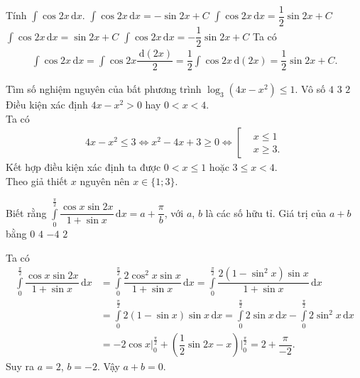\begin{ex}%
 Tính $\displaystyle\int \cos2x\mathrm{\,d}x$.
 \choice
  {$\displaystyle\int \cos2x\mathrm{\,d}x = -\sin2x+C$}
  {\True $\displaystyle\int \cos2x\mathrm{\,d}x = \dfrac{1}{2}\sin2x+C$}
  {$\displaystyle\int \cos2x\mathrm{\,d}x = \sin2x+C$}
  {$\displaystyle\int \cos2x\mathrm{\,d}x = -\dfrac{1}{2}\sin2x+C$}
 \loigiai
  {
  Ta có
  \begin{eqnarray*}
   \displaystyle\int \cos2x\mathrm{\,d}x = \displaystyle\int \cos2x\dfrac{\mathrm{\,d}(2x)}{2}=\dfrac{1}{2}\displaystyle\int \cos2x\mathrm{\,d}(2x) = \dfrac{1}{2}\sin 2x + C.
  \end{eqnarray*}
  }
\end{ex}

\begin{ex}%
 Tìm số nghiệm nguyên của bất phương trình $\log_3\left(4x-x^2\right)\leq 1$.
 \choice
  {Vô số}
  {$4$}
  {$3$}
  {\True $2$}
 \loigiai
  {
  Điều kiện xác định $4x-x^2>0$ hay $0<x<4$.\\
  Ta có
  \begin{eqnarray*}
   4x-x^2 \leq 3 \Leftrightarrow x^2-4x+3 \geq 0 \Leftrightarrow \left[\begin{aligned}&x\leq 1 \\& x\geq 3.\end{aligned}\right.
  \end{eqnarray*}
  Kết hợp điều kiện xác định ta được $0<x \leq 1$ hoặc $3\leq x <4$.\\
  Theo giả thiết $x$ nguyên nên $x \in\{1;3\}$.
  }
\end{ex}

\begin{ex}%
 Biết rằng $\displaystyle\int\limits_0^\frac{\pi}{2}\dfrac{\cos x \sin2x}{1+\sin x}\mathrm{\,d}x=a+\dfrac{\pi}{b}$, với $a$, $b$ là các số hữu tỉ. Giá trị của $a+b$ bằng
 \choice
  { \True $0$}
  {$4$}
  {$-4$}
  {$2$}
 \loigiai
  { Ta có 
  \begin{align*}
   \displaystyle\int\limits_0^\frac{\pi}{2}\dfrac{\cos x \sin2x}{1+\sin x}\mathrm{\,d}x &= \displaystyle\int\limits_0^\frac{\pi}{2}\dfrac{2\cos^2 x \sin x}{1+\sin x}\mathrm{\, d}x
   =\displaystyle\int\limits_0^\frac{\pi}{2}\dfrac{2(1-\sin^2 x)\sin x}{1+\sin x}\mathrm{\, d}x\\
   & =\displaystyle\int\limits_0^\frac{\pi}{2}2(1-\sin x)\sin x \mathrm{\, d}x
   = \displaystyle\int\limits_0^\frac{\pi}{2}2\sin x \mathrm{\, d}x- \displaystyle\int\limits_0^\frac{\pi}{2}2\sin^2 x \mathrm{\, d}x\\
   &=-2\cos x\Big|_0^{\frac{\pi}{2}}+\left(\dfrac{1}{2}\sin 2x -x \right)\Big|_0^{\frac{\pi}{2}}=2+\dfrac{\pi}{-2}.
  \end{align*}
  Suy ra $a=2$, $b=-2$. Vậy $a+b=0$.
 
  }
\end{ex}

